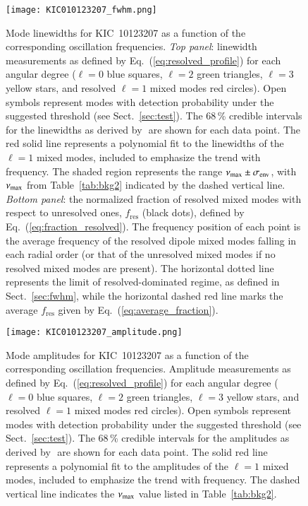 \begin{figure}
   \centering
   \texttt{[image: KIC010123207\_fwhm.png]}
      \caption{Mode linewidths for KIC~10123207 as a function of the corresponding oscillation frequencies. \textit{Top panel}: linewidth measurements as defined by Eq.~(\ref{eq:resolved_profile}) for each angular degree ($\ell = 0$ blue squares, $\ell = 2$ green triangles, $\ell = 3$ yellow stars, and resolved $\ell = 1$ mixed modes red circles). Open symbols represent modes with detection probability under the suggested threshold (see Sect.~\ref{sec:test}). The 68\,\% credible intervals for the linewidths as derived by \diamonds\,\,are shown for each data point. The red solid line represents a polynomial fit to the linewidths of the $\ell = 1$ mixed modes, included to emphasize the trend with frequency. The shaded region represents the range $\nu_\mathrm{max} \pm \sigma_\mathrm{env}$, with $\nu_\mathrm{max}$ from Table~\ref{tab:bkg2} indicated by the dashed vertical line. \textit{Bottom panel}: the normalized fraction of resolved mixed modes with respect to unresolved ones, $f_\mathrm{res}$ (black dots), defined by Eq.~(\ref{eq:fraction_resolved}). The frequency position of each point is the average frequency of the resolved dipole mixed modes falling in each radial order (or that of the unresolved mixed modes if no resolved mixed modes are present). The horizontal dotted line represents the limit of resolved-dominated regime, as defined in Sect.~\ref{sec:fwhm}, while the horizontal dashed red line marks the average $f_\mathrm{res}$ given by Eq.~(\ref{eq:average_fraction}).}
    \label{fig:10123207fwhm}
\end{figure}


\begin{figure}
   \centering
   \texttt{[image: KIC010123207\_amplitude.png]}
      \caption{Mode amplitudes for KIC~10123207 as a function of the corresponding oscillation frequencies. Amplitude measurements as defined by Eq.~(\ref{eq:resolved_profile}) for each angular degree ($\ell = 0$ blue squares, $\ell = 2$ green triangles, $\ell = 3$ yellow stars, and resolved $\ell = 1$ mixed modes red circles). Open symbols represent modes with detection probability under the suggested threshold (see Sect.~\ref{sec:test}). The 68\,\% credible intervals for the amplitudes as derived by \diamonds\,\,are shown for each data point. The solid red line represents a polynomial fit to the amplitudes of the $\ell = 1$ mixed modes, included to emphasize the trend with frequency. The dashed vertical line indicates the $\nu_\mathrm{max}$ value listed in Table~\ref{tab:bkg2}.}
    \label{fig:10123207amplitude}
\end{figure}
\clearpage



